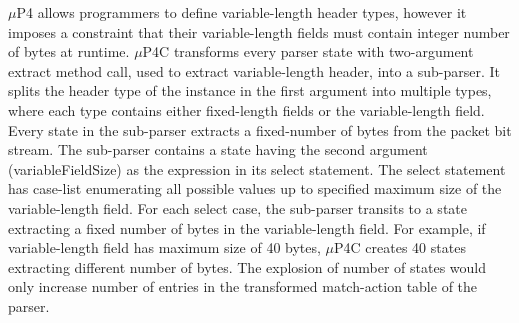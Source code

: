 $\mu$P4 allows programmers to define variable-length header types, however it imposes a constraint that their variable-length fields must contain integer number of bytes at runtime.
$\mu$P4C transforms every parser state with two-argument extract method call, used to extract variable-length header, into a sub-parser.
It splits the header type of the instance in the first argument into multiple types, where each type contains either fixed-length fields or the variable-length field.
Every state in the sub-parser extracts a fixed-number of bytes from the packet bit stream.
The sub-parser contains a state having the second argument (variableFieldSize) as the expression in its select statement.
The select statement has case-list enumerating all possible values up to specified maximum size of the variable-length field.
For each select case, the sub-parser transits to a state extracting a fixed number of bytes in the variable-length field.
For example, if variable-length field has maximum size of 40 bytes, $\mu$P4C creates 40 states extracting different number of bytes.
The explosion of number of states would only increase number of entries in the transformed match-action table of the parser.

% 
% 




